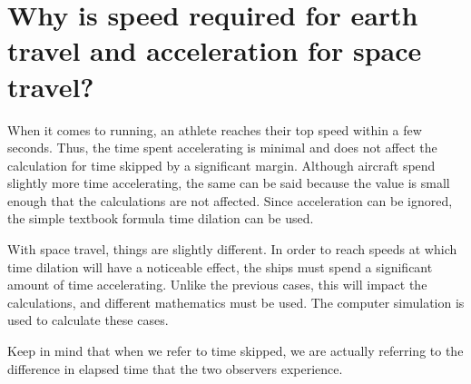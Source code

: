 \section{Why is speed required for earth travel and acceleration for space travel?}
	When it comes to running, an athlete reaches their top speed within a few seconds. Thus, the time spent accelerating is minimal and does not affect the calculation for time skipped by a significant margin. Although aircraft spend slightly more time accelerating, the same can be said because the value is small enough that the calculations are not affected. Since acceleration can be ignored, the simple textbook formula \autocite{textbook} time dilation can be used.

	With space travel, things are slightly different. In order to reach speeds at which time dilation will have a noticeable effect, the ships must spend a significant amount of time accelerating. Unlike the previous cases, this will impact the calculations, and different mathematics must be used. The computer simulation is used to calculate these cases.

	Keep in mind that when we refer to time skipped, we are actually referring to the difference in elapsed time that the two observers experience.
